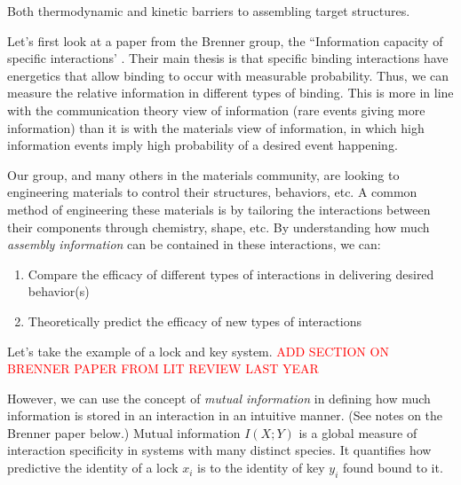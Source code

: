 
Both thermodynamic and kinetic barriers to assembling target structures.

Let's first look at a paper from the Brenner group, the ``Information capacity of specific interactions' \cite{Huntley_2016_PNAS}.
Their main thesis is that specific binding interactions have energetics that allow binding to occur with measurable probability.
Thus, we can measure the relative information in different types of binding.
This is more in line with the communication theory view of information (rare events giving more information) than it is with the materials view of information, in which high information events imply high probability of a desired event happening.

Our group, and many others in the materials community, are looking to engineering materials to control their structures, behaviors, etc.
A common method of engineering these materials is by tailoring the interactions between their components through chemistry, shape, etc.
By understanding how much \textit{assembly information} can be contained in these interactions, we can:
\begin{enumerate}
\item Compare the efficacy of different types of interactions in delivering desired behavior(s)
\item Theoretically predict the efficacy of new types of interactions
\end{enumerate}

Let's take the example of a lock and key system.
\textcolor{red}{ADD SECTION ON BRENNER PAPER FROM LIT REVIEW LAST YEAR}

However, we can use the concept of \textit{mutual information} in defining how much information is stored in an interaction in an intuitive manner.
(See notes on the Brenner paper below.)
Mutual information $I(X;Y)$ is a global measure of interaction specificity in systems with many distinct species.
It quantifies how predictive the identity of a lock $x_i$ is to the identity of key $y_i$ found bound to it.

